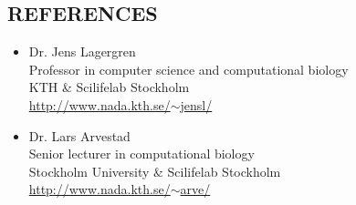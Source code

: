 \documentclass[margin, 10pt]{res} %
\begin{document}
\begin{resume}

\section{REFERENCES} 
\begin{itemize}
\item Dr. Jens Lagergren \\
Professor in computer science and computational biology \\
KTH \& Scilifelab Stockholm \\
\href{http://www.nada.kth.se/~jensl/}{http://www.nada.kth.se/$\sim$jensl/} 

\item Dr. Lars Arvestad \\
Senior lecturer in computational biology \\
Stockholm University \& Scilifelab Stockholm \\
\hfill \href{http://www.nada.kth.se/~arve/}{http://www.nada.kth.se/$\sim$arve/}
\end{itemize}


\end{resume}
\end{document}
